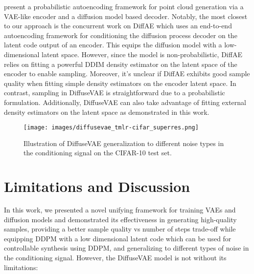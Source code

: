 \documentclass[10pt]{article} \usepackage[accepted]{tmlr}
\begin{document}
\citep{luo2021diffusion} present a probabilistic autoencoding framework for point cloud generation via a VAE-like encoder and a diffusion model based decoder. Notably, the most closest to our approach is the concurrent work on DiffAE \citep{preechakul2021diffusion} which uses an end-to-end autoencoding framework for conditioning the diffusion process decoder on the latent code output of an encoder. This equips the diffusion model with a low-dimensional latent space. However, since the model is non-probabilistic, DiffAE relies on fitting a powerful DDIM density estimator on the latent space of the encoder to enable sampling. Moreover, it's unclear if DiffAE exhibits good sample quality when fitting simple density estimators on the encoder latent space. In contrast, sampling in DiffuseVAE is straightforward due to a probabilistic formulation. Additionally, DiffuseVAE can also take advantage of fitting external density estimators on the latent space as demonstrated in this work.

\begin{figure*}[t]
  \centering
    \texttt{[image: images/diffusevae\_tmlr-cifar\_superres.png]}
    \caption{Illustration of DiffuseVAE generalization to different noise types in the conditioning signal on the CIFAR-10 test set.}
    \label{fig:generalize}
\end{figure*}



\section{Limitations and Discussion}

In this work, we presented a novel unifying framework for training VAEs and diffusion models and demonstrated its effectiveness in generating high-quality samples, providing a better sample quality vs number of steps trade-off while equipping DDPM with a low dimensional latent code which can be used for controllable synthesis using DDPM, and generalizing to different types of noise in the conditioning signal. However, the DiffuseVAE model is not without its limitations:
\end{document}
